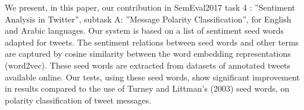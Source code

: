 We present, in this paper, our contribution in SemEval2017 task 4 : ''Sentiment Analysis in Twitter'', subtask A: ''Message Polarity Classification'', for English and Arabic languages. Our system is based on a list of sentiment seed words adapted for tweets. The sentiment relations between seed words and other terms are captured by cosine similarity between the word embedding representations (word2vec). These seed words are extracted from datasets of annotated tweets available online. Our tests, using these seed words, show significant improvement in results compared to the use of Turney and Littman's (2003) seed words, on polarity classification of tweet messages.
